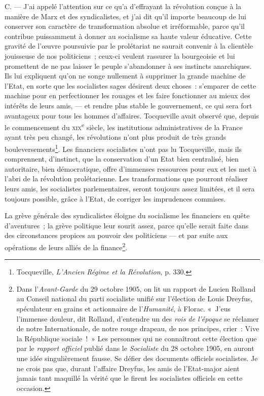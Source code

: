 \documentclass[french,twoside]{book} %
\begin{document}
\noindent C. — J’ai appelé l’attention sur ce qu’a d’effrayant la révolution conçue à la manière de Marx et des syndicalistes, et j’ai dit qu’il importe beaucoup de lui conserver son caractère de transformation absolue et irréformable, parce qu’il contribue puissamment à donner au socialisme sa haute valeur éducative. Cette gravité de l’œuvre poursuivie par le prolétariat ne saurait convenir à la clientèle jouisseuse de nos politiciens ; ceux-ci veulent rassurer la bourgeoisie et lui promettent de ne pas laisser le peuple s’abandonner à ses instincts anarchiques. Ils lui expliquent qu’on ne songe nullement à supprimer la grande machine de l’Etat, en sorte que les socialistes sages désirent deux choses : s’emparer de cette machine pour en perfectionner les rouages et les faire fonctionner au mieux des intérêts de leurs amis, — et rendre plus stable le gouvernement, ce qui sera fort avantageux pour tous les hommes d’affaires. Tocqueville avait observé que, depuis le commencement du {\scshape xix}\textsuperscript{e} siècle, les institutions administratives de la France ayant très peu changé, les révolutions n’ont plus produit de très grands  bouleversements\footnote{ \noindent Tocqueville, \emph{L’Ancien Régime et la Révolution}, p. 330.
 }. Les financiers socialistes n’ont pas lu Tocqueville, mais ils comprennent, d’instinct, que la conservation d’un Etat bien centralisé, bien autoritaire, bien démocratique, offre d’immenses ressources pour eux et les met à l’abri de la révolution prolétarienne. Les transformations que pourront réaliser leurs amis, les socialistes parlementaires, seront toujours assez limitées, et il sera toujours possible, grâce à l’Etat, de corriger les imprudences commises.\par
La grève générale des syndicalistes éloigne du socialisme les financiers en quête d’aventures ; la grève politique leur sourit assez, parce qu’elle serait faite dans des circonstances propices au pouvoir des politiciens — et par suite aux opérations de leurs alliés de la finance\footnote{ \noindent Dans l’\emph{Avant-Garde} du 29 octobre 1905, on lit un rapport de Lucien Rolland au Conseil national du parti socialiste unifié sur l’élection de Louis Dreyfus, spéculateur en grains et actionnaire de l’\emph{Humanité}, à Florac. « J’eus l’immense douleur, dit Rolland, d’entendre un des \emph{rois de l’époque} se réclamer de notre Internationale, de notre rouge drapeau, de nos principes, crier : Vive la République sociale ! » Les personnes qui ne connaîtront cette élection que par le \emph{rapport officiel} publié dans le \emph{Socialiste} du 28 octobre 1905, en auront une idée singulièrement fausse. Se défier des documents officiels socialistes. Je ne crois pas que, durant l’affaire Dreyfus, les amis de l’Etat-major aient jamais tant maquillé la vérité que le firent les socialistes officiels en cette occasion.
 }.\par
\end{document}
